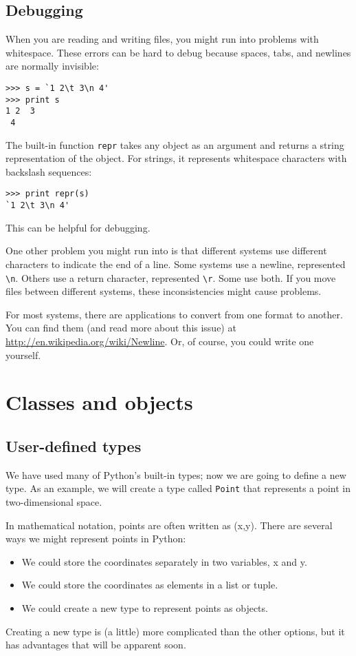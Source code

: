 \documentclass{article}
\begin{document}
\begin{multicols}{2}
\subsection{Debugging} %
When you are reading and writing files, you might run into problems
with whitespace. These errors can be hard to debug because spaces,
tabs, and newlines are normally invisible:
\begin{lstlisting}
>>> s = `1 2\t 3\n 4'
>>> print s
1 2  3
 4
\end{lstlisting}
The built-in function \verb|repr| takes any object as an argument and
returns a string representation of the object. For strings, it
represents whitespace characters with backslash sequences:
\begin{lstlisting}
>>> print repr(s)
`1 2\t 3\n 4'
\end{lstlisting}
This can be helpful for debugging.

One other problem you might run into is that different systems use
different characters to indicate the end of a line. Some systems use a
newline, represented \verb|\n|. Others use a return character, represented
\verb|\r|. Some use both. If you move files between different systems, these
inconsistencies might cause problems.

For most systems, there are applications to convert from one format to
another. You can find them (and read more about this issue) at
\url{http://en.wikipedia.org/wiki/Newline}. Or, of course, you could write
one yourself.
\end{multicols}


\newpage%
\section{Classes and objects}
\subsection{User-defined types}
We have used many of Python’s built-in types; now we are going to define a
new type. As an example, we will create a type called \verb|Point| that
represents a point in two-dimensional space.

In mathematical notation, points are often written as (x,y).
There are several ways we might represent points in Python:
\begin{itemize}
    \item We could store the coordinates separately in two variables, x and y.
    \item We could store the coordinates as elements in a list or tuple.
    \item We could create a new type to represent points as objects.
\end{itemize}
Creating a new type is (a little) more complicated than the other options,
but it has advantages that will be apparent soon.
\end{document}
